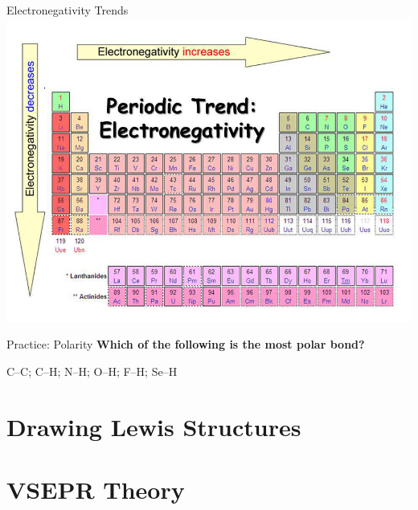 \documentclass[11pt]{beamer}
\begin{document}
\begin{frame}{Electronegativity Trends}
  \centering
  \includegraphics[width=\linewidth]{electronegativity}
\end{frame}

\begin{frame}{Practice: Polarity}
  \textbf{Which of the following is the most polar bond?}

    C--C; C--H; N--H; O--H; F--H; Se--H
\end{frame}

\section{Drawing Lewis Structures}

\section{VSEPR Theory}
\end{document}
